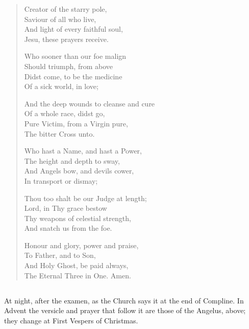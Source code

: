 \begin{verse}
Creator of the starry pole, \\
Saviour of all who live, \\
And light of every faithful soul, \\
Jesu, these prayers receive.

Who sooner than our foe malign \\
Should triumph, from above \\
Didst come, to be the medicine \\
Of a sick world, in love;

And the deep wounds to cleanse and cure \\
Of a whole race, didst go, \\
Pure Victim, from a Virgin pure, \\
The bitter Cross unto.

Who hast a Name, and hast a Power, \\
The height and depth to sway, \\
And Angels bow, and devils cower, \\
In transport or dismay;

Thou too shalt be our Judge at length; \\
Lord, in Thy grace bestow \\
Thy weapons of celestial strength, \\
And snatch us from the foe.

Honour and glory, power and praise, \\
To Father, and to Son, \\
And Holy Ghost, be paid always, \\
The Eternal Three in One. Amen.
\end{verse}

\subsection{}

At night, after the examen, as the Church says it at the end of Compline. In
Advent the versicle and prayer that follow it are those of the Angelus, above;
they change at First Vespers of Christmas.

